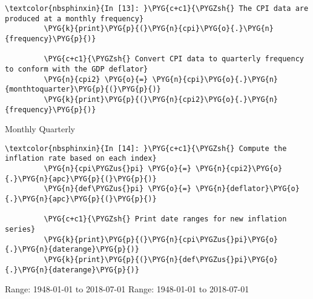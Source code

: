 \documentclass[letterpaper,10pt,openany,oneside,english]{sphinxmanual}
\begin{document}
\noindent{}

%
\begin{Verbatim}[commandchars=\\\{\}]
\textcolor{nbsphinxin}{In [13]: }\PYG{c+c1}{\PYGZsh{} The CPI data are produced at a monthly frequency}
         \PYG{k}{print}\PYG{p}{(}\PYG{n}{cpi}\PYG{o}{.}\PYG{n}{frequency}\PYG{p}{)}
         
         \PYG{c+c1}{\PYGZsh{} Convert CPI data to quarterly frequency to conform with the GDP deflator}
         \PYG{n}{cpi2} \PYG{o}{=} \PYG{n}{cpi}\PYG{o}{.}\PYG{n}{monthtoquarter}\PYG{p}{(}\PYG{p}{)}
         \PYG{k}{print}\PYG{p}{(}\PYG{n}{cpi2}\PYG{o}{.}\PYG{n}{frequency}\PYG{p}{)}
\end{Verbatim}



%
\begin{OriginalVerbatim}[commandchars=\\\{\}]
Monthly
Quarterly
\end{OriginalVerbatim}
\relax

%
\begin{Verbatim}[commandchars=\\\{\}]
\textcolor{nbsphinxin}{In [14]: }\PYG{c+c1}{\PYGZsh{} Compute the inflation rate based on each index}
         \PYG{n}{cpi\PYGZus{}pi} \PYG{o}{=} \PYG{n}{cpi2}\PYG{o}{.}\PYG{n}{apc}\PYG{p}{(}\PYG{p}{)}
         \PYG{n}{def\PYGZus{}pi} \PYG{o}{=} \PYG{n}{deflator}\PYG{o}{.}\PYG{n}{apc}\PYG{p}{(}\PYG{p}{)}
         
         \PYG{c+c1}{\PYGZsh{} Print date ranges for new inflation series}
         \PYG{k}{print}\PYG{p}{(}\PYG{n}{cpi\PYGZus{}pi}\PYG{o}{.}\PYG{n}{daterange}\PYG{p}{)}
         \PYG{k}{print}\PYG{p}{(}\PYG{n}{def\PYGZus{}pi}\PYG{o}{.}\PYG{n}{daterange}\PYG{p}{)}
\end{Verbatim}



%
\begin{OriginalVerbatim}[commandchars=\\\{\}]
Range: 1948-01-01 to 2018-07-01
Range: 1948-01-01 to 2018-07-01
\end{OriginalVerbatim}
\relax
\end{document}
